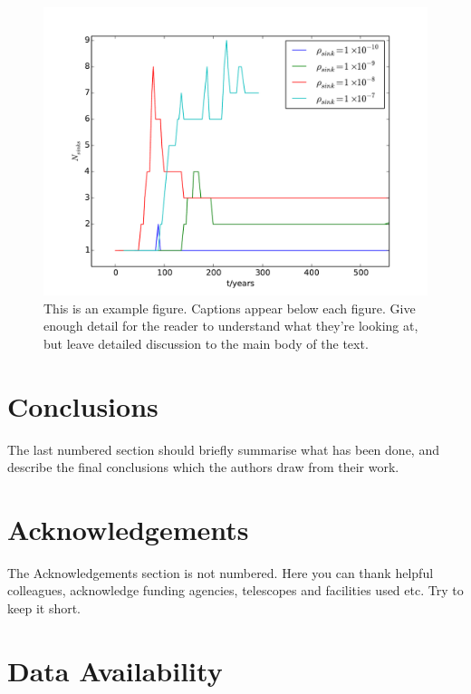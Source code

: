 \documentclass[fleqn,usenatbib]{mnras}
\begin{document}
\begin{figure}
	\includegraphics[width=\columnwidth]{sinks_mergers_zoom.pdf}
    \caption{This is an example figure. Captions appear below each figure.
	Give enough detail for the reader to understand what they're looking at,
	but leave detailed discussion to the main body of the text.}
    \label{fig:example_figure}
\end{figure}




\section{Conclusions}

The last numbered section should briefly summarise what has been done, and describe
the final conclusions which the authors draw from their work.

\section*{Acknowledgements}

The Acknowledgements section is not numbered. Here you can thank helpful
colleagues, acknowledge funding agencies, telescopes and facilities used etc.
Try to keep it short.

\section*{Data Availability}
\end{document}
